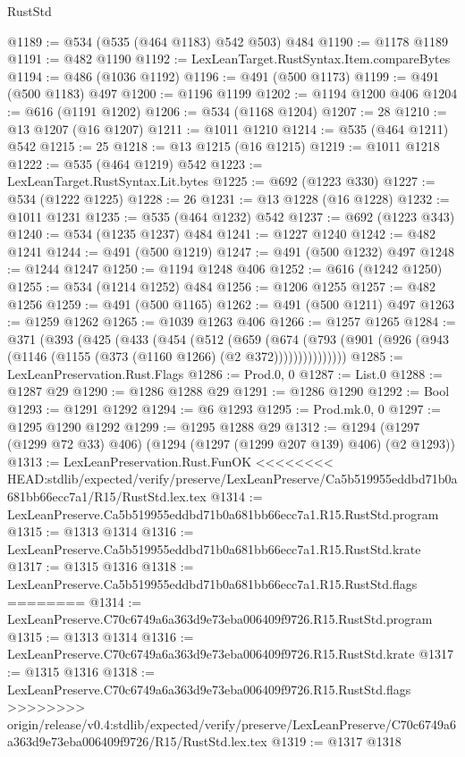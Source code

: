 \begin{lexlean}{RustStd}
\begin{coremodule}
{\begin{coremodule}
{{{{{{{{{{{{{{@1189 := @534 (@535 (@464 @1183) @542 @503) @484
@1190 := @1178 @1189
@1191 := @482 @1190
@1192 := LexLeanTarget.RustSyntax.Item.compareBytes
@1194 := @486 (@1036 @1192)
@1196 := @491 (@500 @1173)
@1199 := @491 (@500 @1183) @497
@1200 := @1196 @1199
@1202 := @1194 @1200 @406
@1204 := @616 (@1191 @1202)
@1206 := @534 (@1168 @1204)
@1207 := 28
@1210 := @13 @1207 (@16 @1207)
@1211 := @1011 @1210
@1214 := @535 (@464 @1211) @542
@1215 := 25
@1218 := @13 @1215 (@16 @1215)
@1219 := @1011 @1218
@1222 := @535 (@464 @1219) @542
@1223 := LexLeanTarget.RustSyntax.Lit.bytes
@1225 := @692 (@1223 @330)
@1227 := @534 (@1222 @1225)
@1228 := 26
@1231 := @13 @1228 (@16 @1228)
@1232 := @1011 @1231
@1235 := @535 (@464 @1232) @542
@1237 := @692 (@1223 @343)
@1240 := @534 (@1235 @1237) @484
@1241 := @1227 @1240
@1242 := @482 @1241
@1244 := @491 (@500 @1219)
@1247 := @491 (@500 @1232) @497
@1248 := @1244 @1247
@1250 := @1194 @1248 @406
@1252 := @616 (@1242 @1250)
@1255 := @534 (@1214 @1252) @484
@1256 := @1206 @1255
@1257 := @482 @1256
@1259 := @491 (@500 @1165)
@1262 := @491 (@500 @1211) @497
@1263 := @1259 @1262
@1265 := @1039 @1263 @406
@1266 := @1257 @1265
@1284 := @371
    (@393
      (@425
        (@433
          (@454
            (@512
              (@659
                (@674
                  (@793 (@901 (@926 (@943 (@1146 (@1155 (@373 (@1160 @1266) (@2 @372)))))))))))))))
@1285 := LexLeanPreservation.Rust.Flags
@1286 := Prod.{0, 0}
@1287 := List.{0}
@1288 := @1287 @29
@1290 := @1286 @1288 @29
@1291 := @1286 @1290
@1292 := Bool
@1293 := @1291 @1292
@1294 := @6 @1293
@1295 := Prod.mk.{0, 0}
@1297 := @1295 @1290 @1292
@1299 := @1295 @1288 @29
@1312 := @1294 (@1297 (@1299 @72 @33) @406) (@1294 (@1297 (@1299 @207 @139) @406) (@2 @1293))
@1313 := LexLeanPreservation.Rust.FunOK
<<<<<<<< HEAD:stdlib/expected/verify/preserve/LexLeanPreserve/Ca5b519955eddbd71b0a681bb66ecc7a1/R15/RustStd.lex.tex
@1314 := LexLeanPreserve.Ca5b519955eddbd71b0a681bb66ecc7a1.R15.RustStd.program
@1315 := @1313 @1314
@1316 := LexLeanPreserve.Ca5b519955eddbd71b0a681bb66ecc7a1.R15.RustStd.krate
@1317 := @1315 @1316
@1318 := LexLeanPreserve.Ca5b519955eddbd71b0a681bb66ecc7a1.R15.RustStd.flags
========
@1314 := LexLeanPreserve.C70c6749a6a363d9e73eba006409f9726.R15.RustStd.program
@1315 := @1313 @1314
@1316 := LexLeanPreserve.C70c6749a6a363d9e73eba006409f9726.R15.RustStd.krate
@1317 := @1315 @1316
@1318 := LexLeanPreserve.C70c6749a6a363d9e73eba006409f9726.R15.RustStd.flags
>>>>>>>> origin/release/v0.4:stdlib/expected/verify/preserve/LexLeanPreserve/C70c6749a6a363d9e73eba006409f9726/R15/RustStd.lex.tex
@1319 := @1317 @1318
}}}}}}}}}}}}}}
\end{coremodule}}
\end{coremodule}
\end{lexlean}

